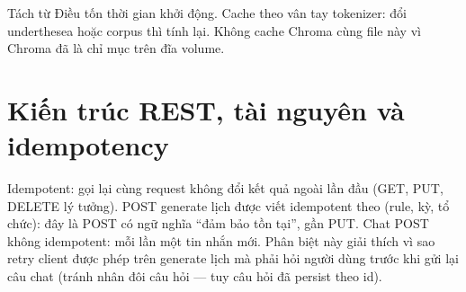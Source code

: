 Tách từ \soDieu{} Điều tốn thời gian khởi động. Cache theo vân tay tokenizer:
đổi underthesea hoặc corpus thì tính lại. Không cache Chroma cùng file này vì
Chroma đã là chỉ mục trên đĩa volume.

\section{Kiến trúc REST, tài nguyên và idempotency}

Idempotent: gọi lại cùng request không đổi kết quả ngoài lần đầu (GET, PUT,
DELETE lý tưởng). POST generate lịch được viết idempotent theo (rule, kỳ, tổ
chức): đây là POST có ngữ nghĩa ``đảm bảo tồn tại'', gần PUT. Chat POST không
idempotent: mỗi lần một tin nhắn mới. Phân biệt này giải thích vì sao retry
client được phép trên generate lịch mà phải hỏi người dùng trước khi gửi lại
câu chat (tránh nhân đôi câu hỏi --- tuy câu hỏi đã persist theo id).

